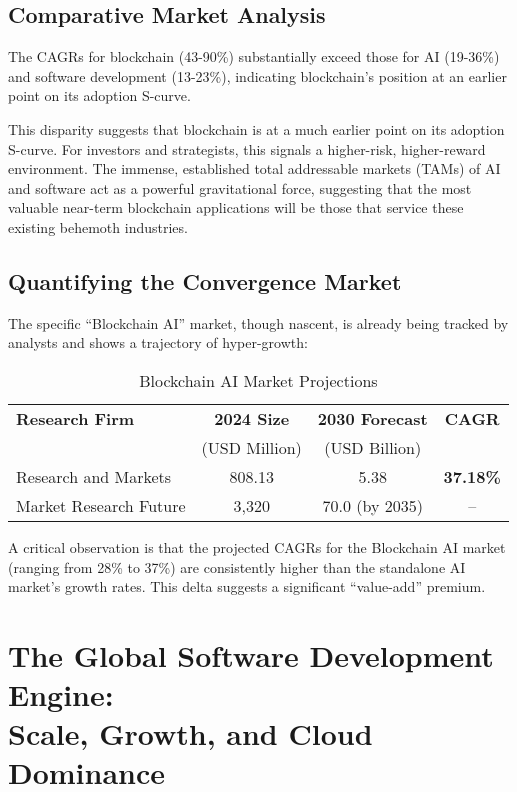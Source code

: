 \documentclass[11pt,a4paper]{report}
\newcommand{\cagr}[1]{\textcolor{sun}{\textbf{#1\%}}}
\begin{document}
\subsection{Comparative Market Analysis}

\begin{keypoint}
The CAGRs for blockchain (43-90\%) substantially exceed those for AI (19-36\%) and software development (13-23\%), indicating blockchain's position at an earlier point on its adoption S-curve.
\end{keypoint}

This disparity suggests that blockchain is at a much earlier point on its adoption S-curve. For investors and strategists, this signals a higher-risk, higher-reward environment. The immense, established total addressable markets (TAMs) of AI and software act as a powerful gravitational force, suggesting that the most valuable near-term blockchain applications will be those that service these existing behemoth industries.

\subsection{Quantifying the Convergence Market}

The specific ``Blockchain AI'' market, though nascent, is already being tracked by analysts and shows a trajectory of hyper-growth:

\begin{table}[H]
\centering
\caption{Blockchain AI Market Projections}
\begin{tabular}{lccc}
\toprule
\textbf{Research Firm} & \textbf{2024 Size} & \textbf{2030 Forecast} & \textbf{CAGR} \\
& (USD Million) & (USD Billion) & \\
\midrule
Research and Markets & 808.13 & 5.38 & \cagr{37.18} \\
Market Research Future & 3,320 & 70.0 (by 2035) & -- \\
\bottomrule
\end{tabular}
\end{table}

A critical observation is that the projected CAGRs for the Blockchain AI market (ranging from 28\% to 37\%) are consistently higher than the standalone AI market's growth rates. This delta suggests a significant ``value-add'' premium.

\clearpage
\section{The Global Software Development Engine:\\Scale, Growth, and Cloud Dominance}
\end{document}
